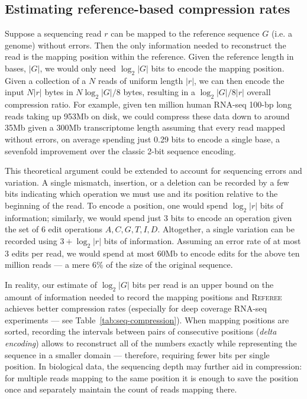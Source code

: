 \documentclass[12pt]{cmuthesis}
\newcommand{\refer}{\textsc{Referee}\xspace}
\begin{document}
  \subsection{Estimating reference-based compression rates}
  \label{sec:seq-comp-methods}


  Suppose a sequencing read $r$ can be mapped to the reference sequence $G$ (i.e. a genome) without errors. Then the only information needed to reconstruct the read is the mapping position within the reference. Given the reference length in bases, $|G|$, we would only need $\log_2 |G|$ bits to encode the mapping position. Given a collection of a $N$ reads of uniform length $|r|$, we can then encode the input $N|r|$ bytes in $N \log_2|G| / 8$ bytes, resulting in a $\log_2|G| / 8|r|$ overall compression ratio. For example, given ten million human RNA-seq 100-bp long reads taking up 953Mb on disk, we could compress these data down to around 35Mb given a 300Mb transcriptome length assuming that every read mapped without errors, on average spending just 0.29 bits to encode a single base, a sevenfold improvement over the classic 2-bit sequence encoding.


  This theoretical argument could be extended to account for sequencing errors and variation. A single mismatch, insertion, or a deletion can be recorded by a few bits indicating which operation we must use and its position relative to the beginning of the read. To encode a position, one would spend $\log_2 |r|$ bits of information; similarly, we would spend just 3 bits to encode an operation given the set of 6 edit operations ${A,C,G,T,I,D}$. Altogether, a single variation can be recorded using $3 + \log_2 |r|$ bits of information. Assuming an error rate of at most 3 edits per read, we would spend at most 60Mb to encode edits for the above ten million reads --- a mere 6\% of the size of the original sequence.

  In reality, our estimate of $\log_2 |G|$ bits per read is an upper bound on the amount of information needed to record the mapping positions and \refer achieves better compression rates (especially for deep coverage RNA-seq experiments --- see Table~\ref{tab:seq-compression}). When mapping positions are sorted, recording the intervals between pairs of consecutive positions (\textit{delta encoding}) allows to reconstruct all of the numbers exactly while representing the sequence in a smaller domain --- therefore, requiring fewer bits per single position. In biological data, the sequencing depth may further aid in compression: for multiple reads mapping to the same position it is enough to save the position once and separately maintain the count of reads mapping there.
\end{document}
